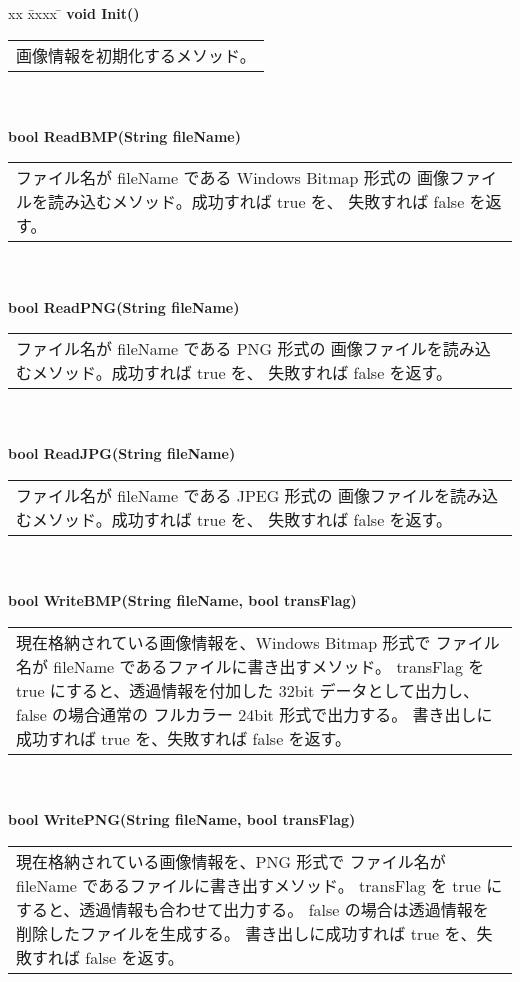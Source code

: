 \begin{tabbing}
xx \= xxxx \= \kill
\> \textbf{void Init()} \\
	\> \> \begin{tabular}{p{15cm}}
		画像情報を初期化するメソッド。
	\end{tabular} \\ \\

\> \textbf{bool ReadBMP(String fileName)} \\
	\> \> \begin{tabular}{p{15cm}}
		ファイル名が fileName である Windows Bitmap 形式の
		画像ファイルを読み込むメソッド。成功すれば true を、
		失敗すれば false を返す。
	\end{tabular} \\ \\

\> \textbf{bool ReadPNG(String fileName)} \\
	\> \> \begin{tabular}{p{15cm}}
		ファイル名が fileName である PNG 形式の
		画像ファイルを読み込むメソッド。成功すれば true を、
		失敗すれば false を返す。
	\end{tabular} \\ \\

\> \textbf{bool ReadJPG(String fileName)} \\
	\> \> \begin{tabular}{p{15cm}}
		ファイル名が fileName である JPEG 形式の
		画像ファイルを読み込むメソッド。成功すれば true を、
		失敗すれば false を返す。
	\end{tabular} \\ \\

\> \textbf{bool WriteBMP(String fileName, bool transFlag)} \\
	\> \> \begin{tabular}{p{15cm}}
		現在格納されている画像情報を、Windows Bitmap 形式で
		ファイル名が fileName であるファイルに書き出すメソッド。
		transFlag を true にすると、透過情報を付加した
		32bit データとして出力し、false の場合通常の
		フルカラー 24bit 形式で出力する。
		書き出しに成功すれば true を、失敗すれば false を返す。
	\end{tabular} \\ \\

\> \textbf{bool WritePNG(String fileName, bool transFlag)} \\
	\> \> \begin{tabular}{p{15cm}}
		現在格納されている画像情報を、PNG 形式で
		ファイル名が fileName であるファイルに書き出すメソッド。
		transFlag を true にすると、透過情報も合わせて出力する。
		false の場合は透過情報を削除したファイルを生成する。
		書き出しに成功すれば true を、失敗すれば false を返す。
	\end{tabular} \\ \\


\end{tabbing}
